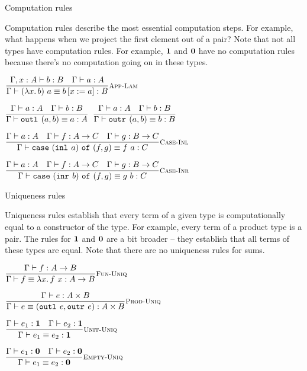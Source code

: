\documentclass{beamer}
\begin{document}
\begin{frame}{Computation rules}

Computation rules describe the most essential computation steps. For example, what happens when we project the first element out of a pair? Note that not all types have computation rules. For example, $\textbf{1}$ and $\textbf{0}$ have no computation rules because there's no computation going on in these types.

\begin{center}
  $\infrule[App-Lam]{\typing[\extend{\Gamma}{x}{A}]{b}{B} \quad \typing{a}{A}}{\compeq{\app{(\fun{x}{b})}{a}}{\subst{b}{x}{a}}{B}}$

  \vspace{1em}

  $\infrule{\typing{a}{A} \quad \typing{b}{B}}{\compeq{\outl{\pair{a}{b}}}{a}{A}}$ \quad
  $\infrule{\typing{a}{A} \quad \typing{b}{B}}{\compeq{\outr{\pair{a}{b}}}{b}{B}}$

  \vspace{1em}

  $\infrule[Case-Inl]{\typing{a}{A} \quad \typing{f}{\Fun{A}{C}} \quad \typing{g}{\Fun{B}{C}}}{\compeq{\case{(\inl{a})}{f}{g}}{\app{f}{a}}{C}}$

  \vspace{1em}

  $\infrule[Case-Inr]{\typing{a}{A} \quad \typing{f}{\Fun{A}{C}} \quad \typing{g}{\Fun{B}{C}}}{\compeq{\case{(\inr{b})}{f}{g}}{\app{g}{b}}{C}}$
\end{center}

\end{frame}

\begin{frame}{Uniqueness rules}

Uniqueness rules establish that every term of a given type is computationally equal to a constructor of the type. For example, every term of a product type is a pair. The rules for $\textbf{1}$ and $\textbf{0}$ are a bit broader -- they establish that all terms of these types are equal. Note that there are no uniqueness rules for sums.

\begin{center}
  $\infrule[Fun-Uniq]{\typing{f}{\Fun{A}{B}}}{\compeq{f}{\fun{x}{\app{f}{x}}}{\Fun{A}{B}}}$

  \vspace{1em}

  $\infrule[Prod-Uniq]{\typing{e}{\Prod{A}{B}}}{\compeq{e}{\pair{\outl{e}}{\outr{e}}}{\Prod{A}{B}}}$

  \vspace{1em}

  $\infrule[Unit-Uniq]{\typing{e_1}{\Unit} \quad \typing{e_2}{\Unit}}{\compeq{e_1}{e_2}{\Unit}}$

  \vspace{1em}

  $\infrule[Empty-Uniq]{\typing{e_1}{\Empty} \quad \typing{e_2}{\Empty}}{\compeq{e_1}{e_2}{\Empty}}$

\end{center}

\end{frame}
\end{document}
